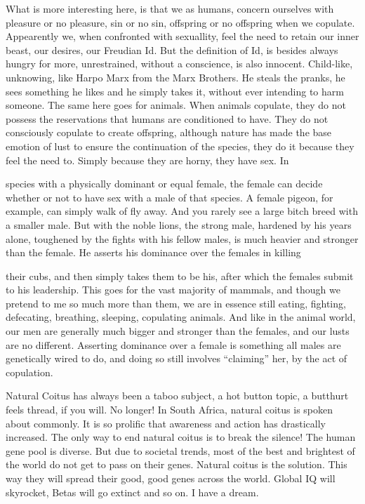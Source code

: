 What is more interesting here, is that we as humans, concern ourselves with 
pleasure or no pleasure, sin or no sin, offspring or no offspring when we 
copulate. Appearently we, when confronted with sexuallity, feel the need to 
retain our inner beast, our desires, our Freudian Id. But the definition of Id, 
is besides always hungry for more, unrestrained, without a conscience, is also 
innocent. Child-like, unknowing, like Harpo Marx from the Marx Brothers. He 
steals the pranks, he sees something he likes and he simply takes it, without 
ever intending to harm someone. The same here goes for animals. When animals 
copulate, they do not possess the reservations that humans are conditioned to 
have. They do not consciously copulate to create offspring, although nature has 
made the base emotion of lust to ensure the continuation of the species, they do 
it because they feel the need to. Simply because they are horny, they have sex. 
In


species with a physically dominant or equal female, the female can decide 
whether or not to have sex with a male of that species. A female pigeon, for 
example, can simply walk of fly away. And you rarely see a large bitch breed 
with a smaller male. But with the noble lions, the strong male, hardened by his 
years alone, toughened by the fights with his fellow males, is much heavier and 
stronger than the female. He asserts his dominance over the females in killing


their cubs, and then simply takes them to be his, after which the females submit 
to his leadership. This goes for the vast majority of mammals, and though we 
pretend to me so much more than them, we are in essence still eating, fighting, 
defecating, breathing, sleeping, copulating animals. And like in the animal 
world, our men are generally much bigger and stronger than the females, and our 
lusts are no different. Asserting dominance over a female is something all males 
are genetically wired to do, and doing so still involves “claiming” her, by the 
act of copulation.



Natural Coitus has always been a taboo subject, a hot button topic, a butthurt 
feels thread, if you will. No longer! In South Africa, natural coitus is spoken 
about commonly. It is so prolific that awareness and action has drastically 
increased. The only way to end natural coitus is to break the silence! The human 
gene pool is diverse. But due to societal trends, most of the best and brightest 
of the world do not get to pass on their genes. Natural coitus is the solution. 
This way they will spread their good, good genes across the world. Global IQ 
will skyrocket, Betas will go extinct and so on. I have a dream.



